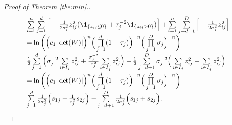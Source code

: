 \begin{proof}[Proof of Theorem \ref{the:min}.]
$$\begin{array}{l}
 \sum\limits_{i=1}^{n} \sum\limits_{j=1}^{d} \Big[ -\frac{1}{2\sigma_j^2}z_{ij}^2 (\1_{ \{ z_{ij} \leq 0 \} } + \tau_{j}^{-2} \1_{ \{ z_{ij} > 0 \} })\Big] +  %
 \sum\limits_{i=1}^{n} \sum\limits_{j=d+1}^{D} \Big[ -\frac{1}{2\sigma_j^2}z_{ij}^2 \Big]  \\[6pt]
= \ln \bigg( \Big( c_1|\det(W)| \Big)^{n} \Big( \prod\limits_{j=1}^{d} (1+\tau_j) \Big)^{-n} \Big( \prod\limits_{j=1}^{D} \sigma_j \Big)^{-n} \bigg)  - \\[6pt]
  \frac{1}{2} \sum\limits_{j=1}^{d} \Big( \sigma_j^{-2} \sum\limits_{i \in I_{j}}    z_{ij}^2   + \frac{\sigma_j^{-2}}{\tau_{j}^{2} }  \sum\limits_{i \in I_{j}^{c}}   z_{ij}^2  \Big) -  %
  \frac{1}{2} \sum\limits_{j=d+1}^{D} \sigma_j^{-2} \Big( \sum\limits_{i \in I_{j}}    z_{ij}^2   +  \sum\limits_{i \in I_{j}^{c}}   z_{ij}^2  \Big) \\[6pt]
= \ln \bigg( \Big( c_1|\det(W)| \Big)^{n} \Big( \prod\limits_{j=1}^{d} (1+\tau_j) \Big)^{-n} \Big( \prod\limits_{j=1}^{D} \sigma_j \Big)^{-n} \bigg) - \\[6pt]
 \sum\limits_{j=1}^{d} \frac{1}{2\sigma_j^{2}} \Big(  s_{1j}  + \frac{1}{\tau_{j}^{2} }  s_{2j}  \Big) - \sum\limits_{j=d+1}^{D} \frac{1}{2\sigma_j^{2}} \Big(  s_{1j}  + s_{2j}  \Big).
\end{array}
$$


\end{proof}
